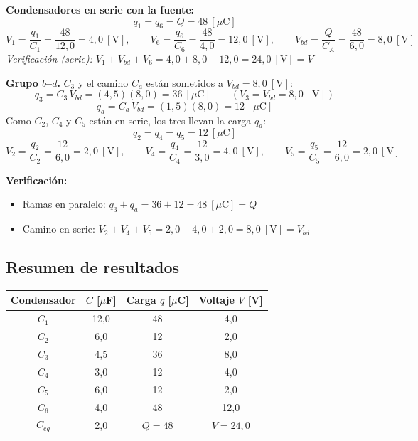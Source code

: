 \documentclass[12pt,letterpaper]{article}
\begin{document}
\textbf{Condensadores en serie con la fuente:}
\[
    \boxed{q_1 = q_6 = Q = 48\ [\mu\text{C}]}
\]
\[
    V_1 = \frac{q_1}{C_1} = \frac{48}{12{,}0} = 4{,}0\ [\text{V}],\qquad
    V_6 = \frac{q_6}{C_6} = \frac{48}{4{,}0} = 12{,}0\ [\text{V}],\qquad
    V_{bd} = \frac{Q}{C_A} = \frac{48}{6{,}0} = 8{,}0\ [\text{V}]
\]
\noindent\textit{Verificaci\'on (serie):} $V_1 + V_{bd} + V_6 = 4{,}0 + 8{,}0 + 12{,}0 = 24{,}0\ [\text{V}] = V$ \checkmark

\medskip
\textbf{Grupo $b$--$d$.} $C_3$ y el camino $C_a$ est\'an sometidos a $V_{bd} = 8{,}0\ [\text{V}]$:
\[
    \boxed{q_3 = C_3\,V_{bd} = (4{,}5)(8{,}0) = 36\ [\mu\text{C}]}\qquad (V_3 = V_{bd} = 8{,}0\ [\text{V}])
\]
\[
    q_a = C_a\,V_{bd} = (1{,}5)(8{,}0) = 12\ [\mu\text{C}]
\]
Como $C_2$, $C_4$ y $C_5$ est\'an en serie, los tres llevan la carga $q_a$:
\[
    \boxed{q_2 = q_4 = q_5 = 12\ [\mu\text{C}]}
\]
\[
    V_2 = \frac{q_2}{C_2} = \frac{12}{6{,}0} = 2{,}0\ [\text{V}],\qquad
    V_4 = \frac{q_4}{C_4} = \frac{12}{3{,}0} = 4{,}0\ [\text{V}],\qquad
    V_5 = \frac{q_5}{C_5} = \frac{12}{6{,}0} = 2{,}0\ [\text{V}]
\]

\noindent\textbf{Verificaci\'on:}
\begin{itemize}\setlength\itemsep{1pt}
    \item Ramas en paralelo: $q_3 + q_a = 36 + 12 = 48\ [\mu\text{C}] = Q$ \checkmark
    \item Camino en serie: $V_2 + V_4 + V_5 = 2{,}0 + 4{,}0 + 2{,}0 = 8{,}0\ [\text{V}] = V_{bd}$ \checkmark
\end{itemize}

\subsection*{Resumen de resultados}

\begin{center}
\renewcommand{\arraystretch}{1.2}
\begin{tabular}{|c|c|c|c|}
\hline
\textbf{Condensador} & \textbf{$C$ [$\mu$F]} & \textbf{Carga $q$ [$\mu$C]} & \textbf{Voltaje $V$ [V]} \\
\hline
$C_1$ & 12{,}0 & 48 & 4{,}0 \\
$C_2$ & 6{,}0  & 12 & 2{,}0 \\
$C_3$ & 4{,}5  & 36 & 8{,}0 \\
$C_4$ & 3{,}0  & 12 & 4{,}0 \\
$C_5$ & 6{,}0  & 12 & 2{,}0 \\
$C_6$ & 4{,}0  & 48 & 12{,}0 \\
\hline
$C_{eq}$ & 2{,}0 & $Q = 48$ & $V = 24{,}0$ \\
\hline
\end{tabular}
\end{center}
\end{document}
